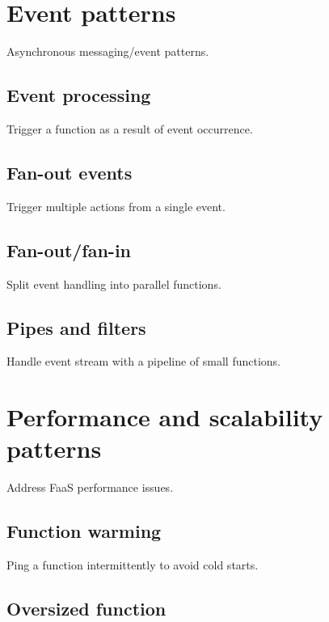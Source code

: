 \section{Event patterns} \label{sec:eventPatterns}

Asynchronous messaging/event patterns.

\subsection{Event processing} \label{subsubsec:Eventprocessing}

Trigger a function as a result of event occurrence.

\subsection{Fan-out events} \label{subsubsec:FanoutEvents}

Trigger multiple actions from a single event.

\subsection{Fan-out/fan-in} \label{subsubsec:FanoutFanin}

Split event handling into parallel functions.

\subsection{Pipes and filters} \label{subsubsec:PipesAndFilters}

Handle event stream with a pipeline of small functions.

\section{Performance and scalability patterns} \label{sec:perfPatterns}

Address FaaS performance issues.

\subsection{Function warming} \label{subsubsec:FunctionWarming}

Ping a function intermittently to avoid cold starts.

\subsection{Oversized function} \label{subsubsec:OversizedFunction}

